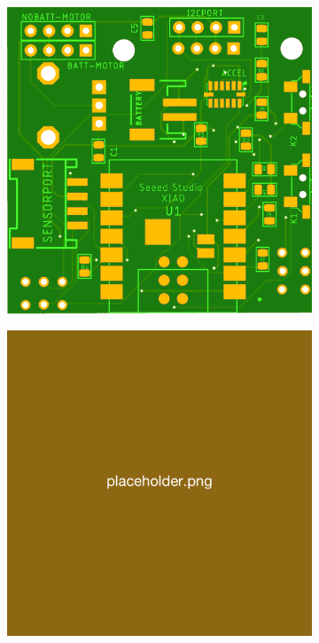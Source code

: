 \begin{figure}[H]
    \centering
    \begin{subfigure}[b]{0.25\textwidth}
        \includegraphics[width=\linewidth]{overleaf/images/pcb_sch.png}
    \end{subfigure}
    \hspace{10pt}
    \begin{subfigure}[b]{0.25\textwidth}
        \includegraphics[width=\linewidth]{overleaf/images/placeholder.png}

\end{subfigure}
\end{figure}
